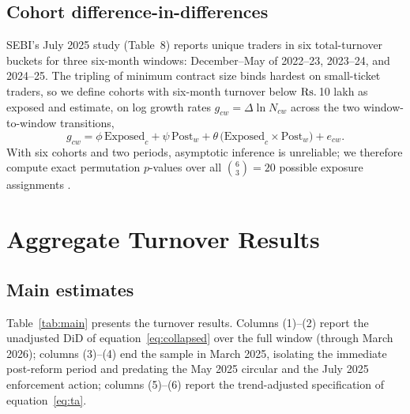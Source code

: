 \documentclass[12pt]{article}
\newcommand{\rupee}{\text{Rs.}\,}
\begin{document}
\subsection{Cohort difference-in-differences}

SEBI's July 2025 study (Table~8) reports unique traders in six total-turnover
buckets for three six-month windows: December--May of 2022--23, 2023--24,
and 2024--25. The tripling of minimum contract size binds hardest on
small-ticket traders, so we define cohorts with six-month turnover below
\(\text{\rupee}\)10 lakh as exposed and estimate, on log growth rates
$g_{cw} = \Delta \ln N_{cw}$ across the two window-to-window transitions,
\begin{equation}
g_{cw} = \phi\,\mathrm{Exposed}_c + \psi\, \mathrm{Post}_w
+ \theta\,\big(\mathrm{Exposed}_c \times \mathrm{Post}_w\big) + e_{cw}.
\label{eq:cohort}
\end{equation}
With six cohorts and two periods, asymptotic inference is unreliable; we
therefore compute exact permutation $p$-values over all $\binom{6}{3}=20$
possible exposure assignments \citep{conleytaber2011}.

\section{Aggregate Turnover Results}\label{sec:results}

\subsection{Main estimates}

Table~\ref{tab:main} presents the turnover results. Columns (1)--(2) report
the unadjusted DiD of equation~\eqref{eq:collapsed} over the full window
(through March 2026); columns (3)--(4) end the sample in March 2025,
isolating the immediate post-reform period and predating the May 2025
circular and the July 2025 enforcement action; columns (5)--(6) report the
trend-adjusted specification of equation~\eqref{eq:ta}.
\end{document}
